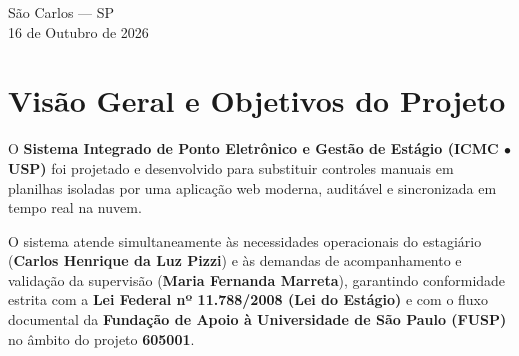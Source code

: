 \documentclass[11pt,a4paper]{article}
\begin{document}
\begin{titlepage}
    \vfill
    
    {\large São Carlos --- SP}\\[0.1cm]
    {\normalsize 16 de Outubro de 2026}
\end{titlepage}

\tableofcontents
\newpage

\section{Visão Geral e Objetivos do Projeto}

O \textbf{Sistema Integrado de Ponto Eletrônico e Gestão de Estágio (ICMC $\bullet$ USP)} foi projetado e desenvolvido para substituir controles manuais em planilhas isoladas por uma aplicação web moderna, auditável e sincronizada em tempo real na nuvem.

O sistema atende simultaneamente às necessidades operacionais do estagiário (\textbf{Carlos Henrique da Luz Pizzi}) e às demandas de acompanhamento e validação da supervisão (\textbf{Maria Fernanda Marreta}), garantindo conformidade estrita com a \textbf{Lei Federal nº 11.788/2008 (Lei do Estágio)} e com o fluxo documental da \textbf{Fundação de Apoio à Universidade de São Paulo (FUSP)} no âmbito do projeto \textbf{605001}.
\end{document}
